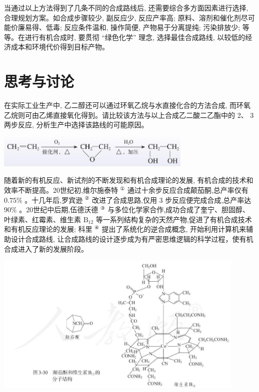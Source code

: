 \documentclass[10pt]{article}
\begin{document}
当通过以上方法得到了几条不同的合成路线后, 还需要综合多方面因素进行选择, 合理规划方案。如合成步骤较少, 副反应少, 反应产率高; 原料、溶剂和催化剂尽可能价廉易得、低毒; 反应条件温和, 操作简便, 产物易于分离提纯; 污染排放少; 等等。在进行有机合成时, 要贯彻 “绿色化学” 理念, 选择最佳合成路线, 以较低的经济成本和环境代价得到目标产物。

\section*{思考与讨论}

在实际工业生产中, 乙二醇还可以通过环氧乙烷与水直接化合的方法合成, 而环氧乙烷则可由乙烯直接氧化得到。请比较该方法与以上合成乙二酸二乙酯中的 2、 3 两步反应, 分析生产中选择该路线的可能原因。

\begin{center}
\includegraphics[max width=0.7\textwidth]{images/0190efc5-b58a-7c43-bfb0-e0a030df9cfd_95_297575.jpg}
\end{center}

随着新的有机反应、新试剂的不断发现和有机合成理论的发展, 有机合成的技术和效率不断提高。20世纪初,维尔施泰特 \({}^{\text{①}}\) 通过十余步反应合成颠茄酮,总产率仅有 \({0.75}\%\) 。十几年后,罗宾逊 \({}^{\text{②}}\) 改进了合成思路,仅用 3 步反应便完成合成,总产率达 \({90}\%\) 。20世纪中后期,伍德沃德 \({}^{\text{③}}\) 与多位化学家合作,成功合成了奎宁、胆固醇、叶绿素、红霉素、维生素 \({\mathrm{B}}_{12}\) 等一系列结构复杂的天然产物,促进了有机合成技术和有机反应理论的发展; 科里 \({}^{\text{④}}\) 提出了系统化的逆合成概念, 开始利用计算机来辅助设计合成路线, 让合成路线的设计逐步成为有严密思维逻辑的科学过程，使有机合成进入了新的发展阶段。

\begin{center}
\includegraphics[max width=0.9\textwidth]{images/0190efc5-b58a-7c43-bfb0-e0a030df9cfd_95_521435.jpg}
\end{center}
\end{document}

